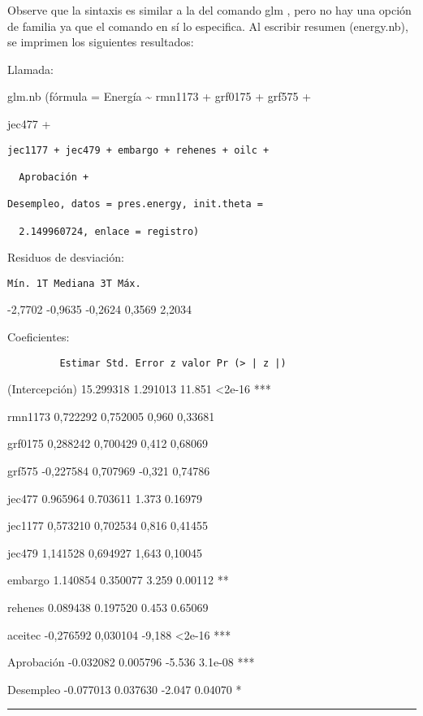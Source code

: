 \documentclass[
]{book}
\begin{document}
Observe que la sintaxis es similar a la del comando glm , pero no hay una opción de familia ya que el comando en sí lo especifica. Al escribir resumen (energy.nb), se imprimen los siguientes resultados:

Llamada:

glm.nb (fórmula = Energía \textasciitilde{} rmn1173 + grf0175 + grf575 +

jec477 +

\begin{verbatim}
jec1177 + jec479 + embargo + rehenes + oilc +

  Aprobación +

Desempleo, datos = pres.energy, init.theta =

  2.149960724, enlace = registro)
\end{verbatim}

Residuos de desviación:

\begin{verbatim}
Mín. 1T Mediana 3T Máx.
\end{verbatim}

-2,7702 -0,9635 -0,2624 0,3569 2,2034

Coeficientes:

\begin{verbatim}
         Estimar Std. Error z valor Pr (> | z |)
\end{verbatim}

(Intercepción) 15.299318 1.291013 11.851 \textless2e-16 ***

rmn1173 0,722292 0,752005 0,960 0,33681

grf0175 0,288242 0,700429 0,412 0,68069

grf575 -0,227584 0,707969 -0,321 0,74786

jec477 0.965964 0.703611 1.373 0.16979

jec1177 0,573210 0,702534 0,816 0,41455

jec479 1,141528 0,694927 1,643 0,10045

embargo 1.140854 0.350077 3.259 0.00112 **

rehenes 0.089438 0.197520 0.453 0.65069

aceitec -0,276592 0,030104 -9,188 \textless2e-16 ***

Aprobación -0.032082 0.005796 -5.536 3.1e-08 ***

Desempleo -0.077013 0.037630 -2.047 0.04070 *

\begin{center}\rule{0.5\linewidth}{0.5pt}\end{center}
\end{document}
